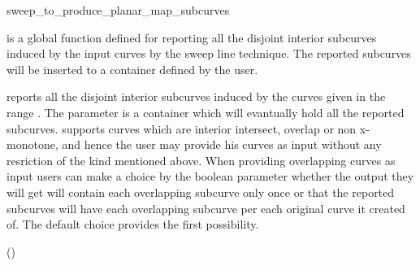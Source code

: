 
\ccRefPageBegin


\begin{ccRefFunction}{sweep_to_produce_planar_map_subcurves}


\ccDefinition
{} is a global function defined for reporting 
all the disjoint interior subcurves induced by the input curves by the sweep line technique.
The reported subcurves will be inserted to a container defined by the user.  


\def\ccLongParamLayout{\ccTrue} 


reports all the disjoint interior subcurves induced by the curves given in the range 
\ccStyle{[curves_begin, curves_end)}. 
The parameter  is a container which will evantually hold all the reported subcurves.
 supports curves which are interior intersect, overlap or non x-monotone, and hence the user may provide his curves as input without any resriction of the kind mentioned above. 
When providing overlapping curves as input users can make a choice by the 
boolean parameter  whether the output they will get will contain each 
overlapping subcurve only once or that the reported subcurves will have each 
overlapping subcurve per each original curve it created of. 
The default choice provides the first possibility.

\ccSeeAlso
{} ()


\end{ccRefFunction}
